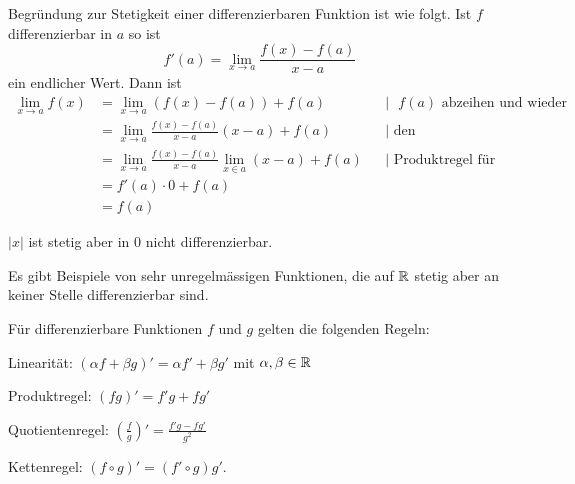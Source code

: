 \begin{bem}
	Begründung zur Stetigkeit einer differenzierbaren Funktion ist wie folgt. Ist $f$ differenzierbar in $a$ so ist
	\[
		f'(a) = \lim_{x \to a} \frac{f(x) -f(a)}{x-a}
	\]
	ein endlicher Wert. Dann ist 
	\begin{align*}
		\lim_{x \to a} f(x) & = \lim_{x \to a} (f(x)-f(a)) + f(a)  & &|\text{ $f(a)$ abzeihen und wieder dazu addieren} 
		\\ & = \lim_{x \to a} \frac{f(x)-f(a)}{x-a} (x-a) + f(a)  & &| \text{ den Ableitungsquotienten zu erzeugen}
		\\ & = \lim_{x \to a} \frac{f(x)-f(a)}{x-a} \lim_{x \in a} (x-a) + f(a)  & &|  \text{ Produktregel für Grenzwerte}
		\\ & = f'(a) \cdot 0 + f(a) 
		\\ & = f(a) 
	\end{align*}
\end{bem} 


\begin{bsp} 
	$|x|$ ist stetig aber in $0$ nicht differenzierbar. 
\end{bsp} 

\begin{bem}
	Es gibt Beispiele von sehr unregelmässigen Funktionen, die auf $\mathbb{R}$ stetig aber an keiner Stelle differenzierbar sind. 
\end{bem} 

\begin{thm}
	Für differenzierbare Funktionen $f$ und $g$ gelten die folgenden Regeln: 
	\begin{enuma}
		\item Linearität: $(\alpha f + \beta g)'= \alpha f' + \beta g'$ mit $\alpha, \beta \in \mathbb{R}$
		\item Produktregel: $(f g)' = f' g + f g'$
		\item Quotientenregel: $\left( \frac{f}{g} \right)' = \frac{f' g  - f g'}{g^2}$
		\item Kettenregel: $(f \circ g)' = (f' \circ g) g'$.  
	\end{enuma}
\end{thm} 


